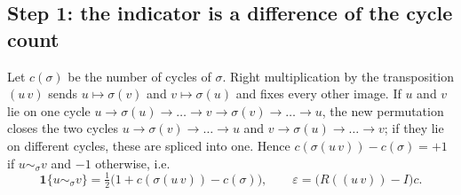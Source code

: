 \documentclass[11pt]{amsart}
\theoremstyle{remark}
\begin{document}
\subsection*{Step 1: the indicator is a difference of the cycle count}
Let $c(\sigma)$ be the number of cycles of $\sigma$.  Right multiplication by the transposition $(u\,v)$ sends $u\mapsto\sigma(v)$ and $v\mapsto\sigma(u)$ and fixes every other image.  If $u$ and $v$ lie on one cycle $u\to\sigma(u)\to\dots\to v\to\sigma(v)\to\dots\to u$, the new permutation closes the two cycles $u\to\sigma(v)\to\dots\to u$ and $v\to\sigma(u)\to\dots\to v$; if they lie on different cycles, these are spliced into one.  Hence $c(\sigma(u\,v))-c(\sigma)=+1$ if $u\sim_\sigma v$ and $-1$ otherwise, i.e.
\begin{equation}\label{eq:step1}
\mathbf 1\{u\sim_\sigma v\}=\tfrac12\bigl(1+c(\sigma(u\,v))-c(\sigma)\bigr),
\qquad
\varepsilon=\bigl(R((u\,v))-I\bigr)c .
\end{equation}
\end{document}
